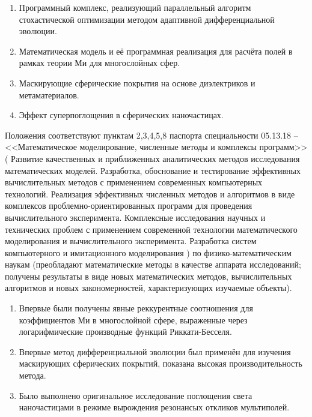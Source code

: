 \begin{enumerate}
\item Программный комплекс, реализующий параллельный алгоритм
  стохастической оптимизации методом адаптивной дифференциальной
  эволюции.
\item Математическая модель и её программная реализация для расчёта
  полей в рамках теории Ми для многослойных сфер.
\item Маскирующие сферические покрытия на основе диэлектриков и метаматериалов.
\item Эффект суперпоглощения в сферических наночастицах.
\end{enumerate}
Положения соответствуют пунктам 2,3,4,5,8 паспорта специальности
05.13.18 -- <<Математическое моделирование, численные методы и
комплексы программ>> (%
Развитие качественных и приближенных аналитических методов
исследования математических моделей.
Разработка, обоснование и тестирование эффективных вычислительных
методов с применением современных компьютерных технологий.
Реализация эффективных численных методов и алгоритмов в виде
комплексов проблемно-ориентированных программ для проведения
вычислительного эксперимента.
Комплексные исследования научных и технических проблем с
применением современной технологии математического моделирования и
вычислительного эксперимента.
Разработка систем компьютерного и имитационного моделирования%
) по физико-математическим наукам (преобладают математические методы в
качестве аппарата исследований; получены результаты в виде новых
математических методов, вычислительных алгоритмов и новых
закономерностей, характеризующих изучаемые объекты).  \novelty
\begin{enumerate}
  \item Впервые были получены явные реккурентные соотношения для
    коэффициентов Ми в многослойной сфере, выраженные через
    логарифмические производные функций Риккати-Бесселя. 
  \item Впервые метод дифференциальной эволюции был применён
    для изучения маскирующих сферических покрытий, показана высокая
    производительность метода.
  \item Было выполнено оригинальное исследование поглощения света
    наночастицами в режиме вырождения резонансых откликов мультиполей.
\end{enumerate}

